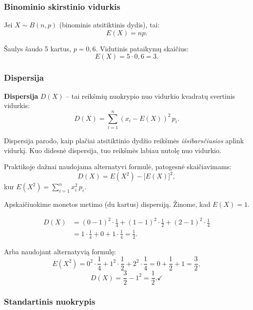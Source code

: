 \subsubsection*{Binominio skirstinio vidurkis}

Jei $X \sim B(n, p)$ (binominis atsitiktinis dydis), tai:
\[
E(X) = np.
\]

\begin{example}
Šaulys šaudo 5 kartus, $p = 0{,}6$. Vidutinis pataikymų skaičius:
\[
E(X) = 5 \cdot 0{,}6 = 3.
\]
\end{example}

\subsubsection*{Dispersija}

\begin{definition}
\textbf{Dispersija} $D(X)$ – tai reikšmių nuokrypio nuo vidurkio kvadratų svertinis vidurkis:
\[
D(X) = \sum_{i=1}^{n} (x_i - E(X))^2 \, p_i.
\]
\end{definition}

Dispersija parodo, kaip plačiai atsitiktinio dydžio reikšmės \emph{išsibarsčiusios} aplink vidurkį. Kuo didesnė dispersija, tuo reikšmės labiau nutolę nuo vidurkio.

\begin{remark}
Praktikoje dažnai naudojama alternatyvi formulė, patogesnė skaičiavimams:
\[
D(X) = E(X^2) - \bigl[E(X)\bigr]^2,
\]
kur $E(X^2) = \displaystyle\sum_{i=1}^{n} x_i^2 \, p_i$.
\end{remark}

\begin{example}
Apskaičiuokime monetos metimo (du kartus) dispersiją. Žinome, kad $E(X) = 1$.

\begin{align*}
D(X) &= (0-1)^2 \cdot \frac{1}{4} + (1-1)^2 \cdot \frac{1}{2} + (2-1)^2 \cdot \frac{1}{4} \\
     &= 1 \cdot \frac{1}{4} + 0 + 1 \cdot \frac{1}{4} = \frac{1}{2}.
\end{align*}

Arba naudojant alternatyvią formulę:
\[
E(X^2) = 0^2 \cdot \frac{1}{4} + 1^2 \cdot \frac{1}{2} + 2^2 \cdot \frac{1}{4} = 0 + \frac{1}{2} + 1 = \frac{3}{2},
\]
\[
D(X) = \frac{3}{2} - 1^2 = \frac{1}{2}. \checkmark
\]
\end{example}

\subsubsection*{Standartinis nuokrypis}

